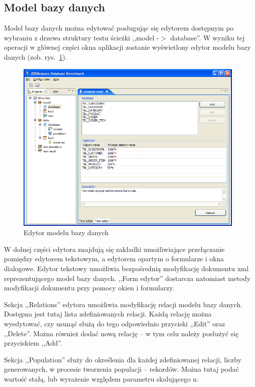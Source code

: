 \subsection{Model bazy danych}
Model bazy danych można edytować posługując się edytorem dostępnym po wybraniu z
drzewa struktury testu ścieżki ,,model -$>$ database''. W wyniku tej operacji w
głównej części okna aplikacji zostanie wyświetlony edytor modelu bazy danych (zob. rys.~\ref{rys:databaseedytor}).
\begin{figure}[h]
\begin{center}
\includegraphics[width=0.9\linewidth]{figures/gui/12.png}
\end{center}
\caption{Edytor modelu bazy danych}\label{rys:databaseedytor}
\end{figure}
W dolnej części edytora znajdują się zakładki umożliwiające przełączanie
pomiędzy edytorem tekstowym, a edytorem opartym o formularze i okna dialogowe.
Edytor tekstowy umożliwia bezpośrednią modyfikację dokumentu xml reprezentującego model bazy danych.
,,Form edytor'' dostarcza natomiast metody modyfikacji dokumentu przy pomocy okien i formularzy.

Sekcja ,,Relations'' edytora umożliwia modyfikację relacji modelu bazy danych. Dostępna jest tutaj lista zdefiniowanych 
relacji. Każdą relację można wyedytować, czy usunąć służą do tego odpowiednio przyciski ,,Edit'' oraz ,,Delete''.
Można również dodać nową relację -- w tym celu należy posłużyć się przyciskiem ,,Add''. 

Sekcja ,,Population'' służy do określenia dla każdej zdefiniowanej relacji, liczby generowanych, w procesie
tworzenia populacji -- rekordów. Można tutaj podać wartość stałą, lub wyrażenie względem parametru skalującego n.

